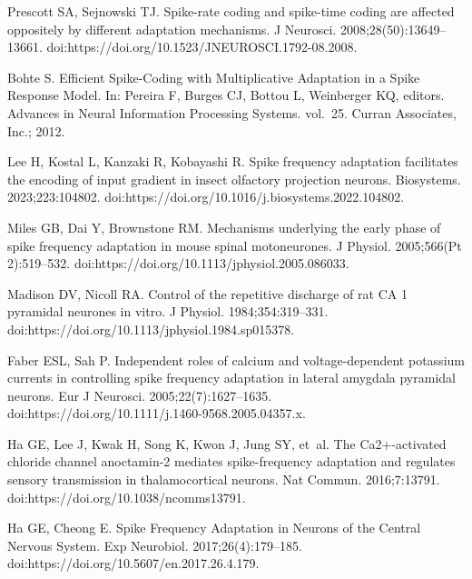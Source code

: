 \documentclass[10pt,letterpaper]{article}
\begin{document}
\begin{thebibliography}{100}
  Prescott SA, Sejnowski TJ.
  \newblock Spike-rate coding and spike-time coding are affected oppositely by
    different adaptation mechanisms.
  \newblock J Neurosci. 2008;28(50):13649--13661.
  \newblock doi:{https://doi.org/10.1523/JNEUROSCI.1792-08.2008}.
  
  Bohte S.
  \newblock Efficient {Spike-Coding} with Multiplicative Adaptation in a Spike
    Response Model.
  \newblock In: Pereira F, Burges CJ, Bottou L, Weinberger KQ, editors. Advances
    in Neural Information Processing Systems. vol.~25. Curran Associates, Inc.;
    2012.
  
  Lee H, Kostal L, Kanzaki R, Kobayashi R.
  \newblock Spike frequency adaptation facilitates the encoding of input gradient
    in insect olfactory projection neurons.
  \newblock Biosystems. 2023;223:104802.
  \newblock doi:{https://doi.org/10.1016/j.biosystems.2022.104802}.
  
  Miles GB, Dai Y, Brownstone RM.
  \newblock Mechanisms underlying the early phase of spike frequency adaptation
    in mouse spinal motoneurones.
  \newblock J Physiol. 2005;566(Pt 2):519--532.
  \newblock doi:{https://doi.org/10.1113/jphysiol.2005.086033}.
  
  Madison DV, Nicoll RA.
  \newblock Control of the repetitive discharge of rat {CA} 1 pyramidal neurones
    in vitro.
  \newblock J Physiol. 1984;354:319--331.
  \newblock doi:{https://doi.org/10.1113/jphysiol.1984.sp015378}.
  
  Faber ESL, Sah P.
  \newblock Independent roles of calcium and voltage-dependent potassium currents
    in controlling spike frequency adaptation in lateral amygdala pyramidal
    neurons.
  \newblock Eur J Neurosci. 2005;22(7):1627--1635.
  \newblock doi:{https://doi.org/10.1111/j.1460-9568.2005.04357.x}.
  
  Ha GE, Lee J, Kwak H, Song K, Kwon J, Jung SY, et~al.
  \newblock The Ca2+-activated chloride channel anoctamin-2 mediates
    spike-frequency adaptation and regulates sensory transmission in
    thalamocortical neurons.
  \newblock Nat Commun. 2016;7:13791.
  \newblock doi:{https://doi.org/10.1038/ncomms13791}.
  
  Ha GE, Cheong E.
  \newblock Spike Frequency Adaptation in Neurons of the Central Nervous System.
  \newblock Exp Neurobiol. 2017;26(4):179--185.
  \newblock doi:{https://doi.org/10.5607/en.2017.26.4.179}.
  

\end{thebibliography}
\end{document}
